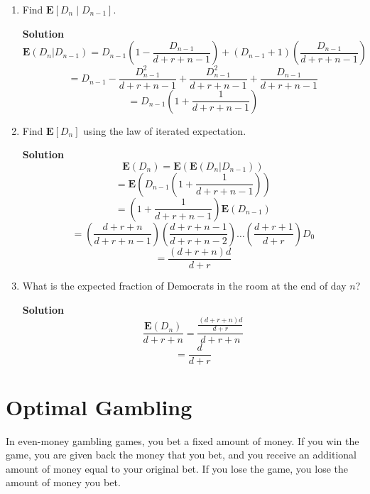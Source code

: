 \documentclass[11pt]{article}
\newcommand*{\Question}[1]{\section{#1}}
\newenvironment{Parts}{\begin{enumerate}[label=(\alph*)]}{\end{enumerate}}
\newcommand*{\Part}{\item}
\newenvironment{Answer}{\vspace{10pt}\begin{mdframed}\textbf{Solution}\\}{\end{mdframed}\vfill\pagebreak[3]}
\newenvironment{Answer}{\vspace{10pt}}{\vfill\pagebreak[3]}
\newcommand*{\E}{\textbf{E}}
\begin{document}
\begin{Parts}
  \Part Find $\E[D_n \mid D_{n-1}]$.
  \begin{Answer}
    $$\E(D_n|D_{n-1})=D_{n-1}(1-\frac{D_{n-1}}{d+r+n-1})+(D_{n-1}+1)(\frac{D_{n-1}}{d+r+n-1})$$
    $$=D_{n-1}-\frac{D_{n-1}^2}{d+r+n-1}+\frac{D_{n-1}^2}{d+r+n-1}+\frac{D_{n-1}}{d+r+n-1}$$
    $$=D_{n-1}(1+\frac{1}{d+r+n-1})$$
  \end{Answer}
  
  \Part Find $\E[D_n]$ using the law of iterated expectation.
  \begin{Answer}
    $$\E(D_n)=\E(\E(D_n|D_{n-1}))$$
    $$=\E(D_{n-1}(1+\frac{1}{d+r+n-1}))$$
    $$=(1+\frac{1}{d+r+n-1})\E(D_{n-1})$$
    $$=(\frac{d+r+n}{d+r+n-1})(\frac{d+r+n-1}{d+r+n-2})\dots(\frac{d+r+1}{d+r})D_0$$
    $$=\frac{(d+r+n)d}{d+r}$$
  \end{Answer}
  
  \Part What is the expected fraction of Democrats in the room at the end of day $n$?
  \begin{Answer}
    $$\frac{\E(D_n)}{d+r+n}=\frac{\frac{(d+r+n)d}{d+r}}{d+r+n}$$
    $$=\frac{d}{d+r}$$
  \end{Answer}
\end{Parts}


\Question{Optimal Gambling}

In even-money gambling games, you bet a fixed amount of money. If you win the game, you are given back the money that you bet, and you receive an additional amount of money equal to your original bet. If you lose the game, you lose the amount of money you bet.
\end{document}
